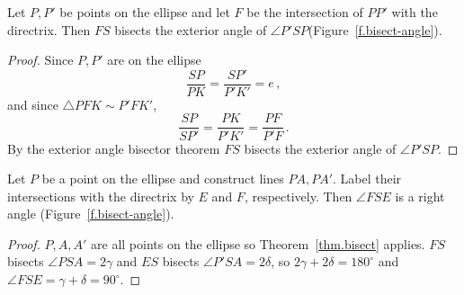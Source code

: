 \begin{theorem}\label{thm.bisect}
Let $P,P'$ be points on the ellipse and let $F$ be the intersection of $PP'$ with the directrix. Then $FS$ bisects the exterior angle of $\angle P'SP$(Figure~\ref{f.bisect-angle}).
\end{theorem}
\begin{proof}
Since $P,P'$ are on the ellipse 
\[
\frac{SP}{PK}=\frac{SP'}{P'K'}=e\,,
\]
and since $\triangle PFK\sim P'FK'$,
\[
\frac{SP}{SP'}=\frac{PK}{P'K'}=\frac{PF}{P'F}\,.
\]
By the exterior angle bisector theorem $FS$ bisects the exterior angle of $\angle P'SP$.\hqed
\end{proof}

\begin{theorem}\label{thm.right-angle}
Let $P$ be a point on the ellipse and construct lines $PA,PA'$. Label their intersections with the directrix by $E$ and $F$, respectively. Then $\angle FSE$ is a right angle (Figure~\ref{f.bisect-angle}).
\end{theorem}

\begin{proof}
$P,A,A'$ are all points on the ellipse so Theorem~\ref{thm.bisect} applies. $FS$ bisects $\angle PSA=2\gamma$ and $ES$ bisects $\angle P'SA=2\delta$, so $2\gamma + 2\delta= 180^\circ$ and $\angle FSE=\gamma + \delta= 90^\circ$.\hqed
\end{proof}

